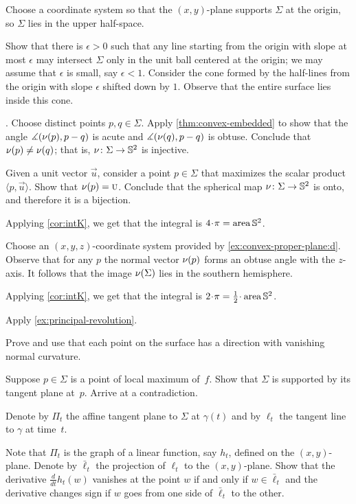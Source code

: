 \begin{multicols}{2}
Choose a coordinate system so that the $(x,y)$-plane supports $\Sigma$ at the origin, so $\Sigma$ lies in the upper half-space. 

Show that there is $\epsilon>0$ such that any line starting from the origin with slope at most $\epsilon$ may intersect $\Sigma$ only in the unit ball centered at the origin;
we may assume that $\epsilon$ is small, say $\epsilon<1$.
Consider the cone formed by the half-lines from the origin with slope $\epsilon$ shifted down by $1$.
Observe that the entire surface lies inside this cone.

\parbf{\ref{ex:intK}}.
Choose distinct points $p,q\in\Sigma$.
Apply \ref{thm:convex-embedded} to show that the angle 
$\measuredangle(\nu(p),p-q)$ is acute and $\measuredangle(\nu(q),p-q)$ is obtuse.
Conclude that $\nu(p)\ne\nu(q)$;
that is, $\nu\colon\Sigma\to\mathbb{S}^2$ is injective.

Given a unit vector $\vec u$, consider a point $p\in \Sigma$ that maximizes the scalar product $\langle p,\vec u\rangle$.
Show that $\nu(p)=\text{\sc{u}}$.
Conclude that the spherical map $\nu\colon\Sigma\to\mathbb{S}^2$ is onto, and therefore it is a bijection.

Applying \ref{cor:intK}, we get that the integral is $4\cdot\pi=\area\mathbb{S}^2$.

 Choose an $(x,y,z)$-coordinate system provided by \ref{ex:convex-proper-plane:d}.
Observe that for any $p$ the normal vector $\nu(p)$ forms an obtuse angle with the $z$-axis.
It follows that the image $\nu(\Sigma)$ lies in the southern hemisphere.

Applying \ref{cor:intK}, we get that the integral is $2\cdot\pi=\tfrac12\cdot\area\mathbb{S}^2$.

Apply \ref{ex:principal-revolution}.

Prove and use that each point on the surface has a direction with vanishing normal curvature.

 Suppose $p\in \Sigma$ is a point of local maximum of~$f$.
Show that $\Sigma$ is supported by its tangent plane at~$p$.
Arrive at a contradiction.


Denote by $\Pi_t$ the affine tangent plane to $\Sigma$ at $\gamma(t)$ and by $\ell_t$ the tangent line to $\gamma$ at time~$t$.

Note that $\Pi_t$ is the graph of a linear function, say $h_t$, defined on the $(x, y)$-plane.
Denote by $\bar\ell_t$ the projection of $\ell_t$ to the $(x, y)$-plane.
Show that the derivative $\tfrac{d}{dt}h_t(w)$ vanishes at the point $w$ if and only if $w\in \bar\ell_t$ 
and the derivative changes sign if $w$ goes from one side of $\bar\ell_t$ to the other.


\end{multicols}
